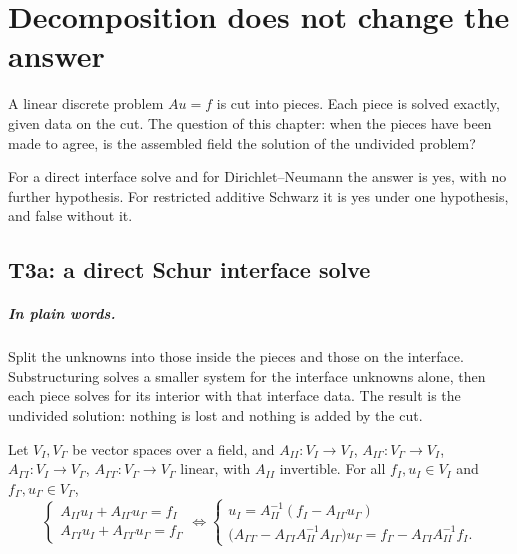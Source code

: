 \chapter{Decomposition does not change the answer}

A linear discrete problem $Au=f$ is cut into pieces.  Each piece is solved
exactly, given data on the cut.  The question of this chapter: when the pieces
have been made to agree, is the assembled field the solution of the undivided
problem?

For a direct interface solve and for Dirichlet--Neumann the answer is yes, with
no further hypothesis.  For restricted additive Schwarz it is yes under one
hypothesis, and false without it.

\section{T3a: a direct Schur interface solve}

\paragraph{In plain words.}
Split the unknowns into those inside the pieces and those on the interface.
Substructuring solves a smaller system for the interface unknowns alone, then
each piece solves for its interior with that interface data.  The result is
the undivided solution: nothing is lost and nothing is added by the cut.

\begin{theorem}\label{thm:T3a}
  \leanok
  Let $V_I,V_\Gamma$ be vector spaces over a field, and
  $A_{II}:V_I\to V_I$, $A_{I\Gamma}:V_\Gamma\to V_I$,
  $A_{\Gamma I}:V_I\to V_\Gamma$, $A_{\Gamma\Gamma}:V_\Gamma\to V_\Gamma$ linear,
  with $A_{II}$ invertible.  For all $f_I,u_I\in V_I$ and
  $f_\Gamma,u_\Gamma\in V_\Gamma$,
  \[
    \begin{cases}A_{II}u_I+A_{I\Gamma}u_\Gamma=f_I\\
    A_{\Gamma I}u_I+A_{\Gamma\Gamma}u_\Gamma=f_\Gamma\end{cases}
    \iff
    \begin{cases}u_I=A_{II}^{-1}(f_I-A_{I\Gamma}u_\Gamma)\\
    \bigl(A_{\Gamma\Gamma}-A_{\Gamma I}A_{II}^{-1}A_{I\Gamma}\bigr)u_\Gamma
      =f_\Gamma-A_{\Gamma I}A_{II}^{-1}f_I .\end{cases}
  \]
\end{theorem}

